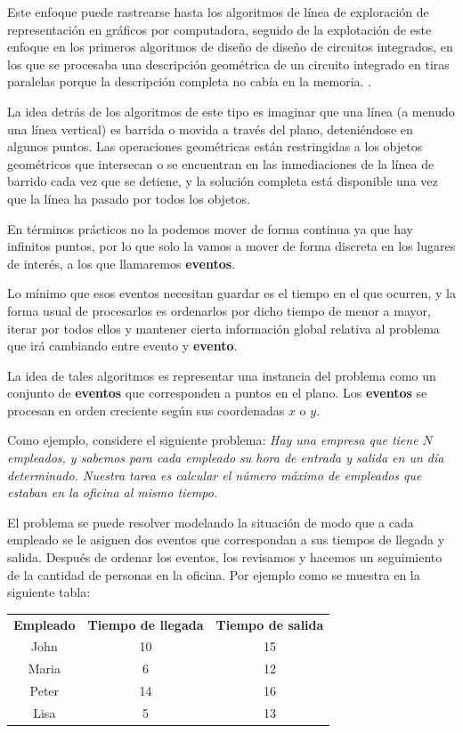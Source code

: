 Este enfoque puede rastrearse hasta los algoritmos de línea de exploración de representación en gráficos por computadora, seguido de la explotación de este enfoque en los primeros algoritmos de diseño de diseño de circuitos integrados, en los que se procesaba una descripción geométrica de un circuito integrado en tiras paralelas porque la descripción completa no cabía en la memoria. .

La idea detrás de los algoritmos de este tipo es imaginar que una línea (a menudo una línea vertical) es barrida o movida a través del plano, deteniéndose en algunos puntos. Las operaciones geométricas están restringidas a los objetos geométricos que intersecan o se encuentran en las inmediaciones de la línea de barrido cada vez que se detiene, y la solución completa está disponible una vez que la línea ha pasado por todos los objetos.

En términos prácticos no la podemos mover de forma continua ya que hay infinitos puntos, por lo que solo la vamos a mover de forma discreta en los lugares de interés, a los que llamaremos \textbf{eventos}.

Lo mínimo que esos eventos necesitan guardar es el tiempo en el que ocurren, y la forma usual de procesarlos es ordenarlos por dicho tiempo de menor a mayor, iterar por todos ellos y mantener cierta información global relativa al problema que irá cambiando entre evento y \textbf{evento}.

La idea de tales algoritmos es representar una instancia del problema como un conjunto de \textbf{eventos} que corresponden a puntos en el plano. Los \textbf{eventos} se procesan en orden creciente según sus coordenadas $x$ o $y$.

Como ejemplo, considere el siguiente problema: \emph{Hay una empresa que tiene $N$ empleados, y sabemos para cada empleado su hora de entrada y salida en un día determinado. Nuestra tarea es calcular el número máximo de empleados que estaban en la oficina al mismo tiempo.}

El problema se puede resolver modelando la situación de modo que a cada empleado se le asignen dos eventos que correspondan a sus tiempos de llegada y salida. Después de ordenar los eventos, los revisamos y hacemos un seguimiento de la cantidad de personas en la oficina. Por ejemplo como se muestra en la siguiente tabla:



\begin{longtable}{ccc}
	
	\textbf{Empleado}& \textbf{Tiempo de llegada}  & \textbf{Tiempo de salida}  \\
	
	John & 10 & 15  \\

	Maria & 6 & 12 \\

	Peter & 14  & 16 \\
	
	Lisa & 5  &  13 \\
	
\end{longtable}

